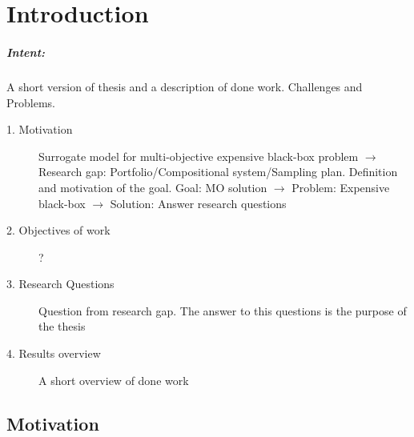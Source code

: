 \chapter{Introduction}\label{sec:intro}

\begin{blockquote}
\paragraph{Intent:} A short version of thesis and a description of done work. Challenges and Problems.

    \begin{description}
        \item[1. Motivation] Surrogate model for multi-objective expensive black-box problem $\rightarrow$ Research gap: Portfolio/Compositional system/Sampling plan. Definition and motivation of the goal. Goal: MO solution $\rightarrow$ Problem: Expensive black-box $\rightarrow$ Solution: Answer research questions
        \item[2. Objectives of work] ?
        \item[3. Research Questions] Question from research gap. The answer to this questions is the purpose of the thesis
        \item[4. Results overview] A short overview of done work
    \end{description}
\end{blockquote}

\section{Motivation}

